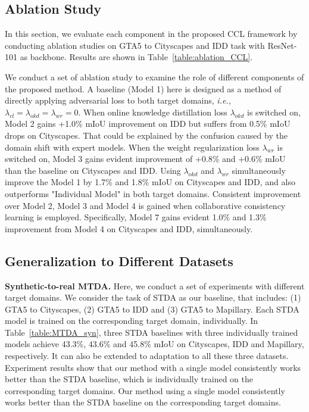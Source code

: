 \subsection{Ablation Study}
In this section, we evaluate each component in the proposed CCL framework by conducting ablation studies on GTA5 to Cityscapes and IDD task with ResNet-101 as backbone. Results are shown in Table~\ref{table:ablation_CCL}.

We conduct a set of ablation study to examine the role of different components of the proposed method. A baseline (Model 1) here is designed as a method of directly applying adversarial loss to both target domains, \textit{i.e.,} $\lambda_{cl}=\lambda_{okd}=\lambda_{wr}=0$. When online knowledge distillation loss $\lambda_{okd}$ is switched on, Model 2 gains +1.0\% mIoU improvement on IDD but suffers from 0.5\% mIoU drops on Cityscapes. That could be explained by the confusion caused by the domain shift with expert models. When the weight regularization loss $\lambda_{wr}$ is switched on, Model 3 gains evident improvement of +0.8\% and +0.6\% mIoU than the baseline on Cityscapes and IDD. Using $\lambda_{okd}$ and $\lambda_{wr}$ simultaneously improve the Model 1 by 1.7\% and 1.8\% mIoU on Cityscapes and IDD, and also outperforms "Individual Model" in both target domains. Consistent improvement over Model 2, Model 3 and Model 4 is gained when collaborative consistency learning is employed. Specifically, Model 7 gains evident 1.0\% and 1.3\% improvement from Model 4 on Cityscapes and IDD, simultaneously.


\subsection{Generalization to Different Datasets}
\textbf{Synthetic-to-real MTDA.}
Here, we conduct a set of experiments with different target domains. We consider the task of STDA as our baseline, that includes: (1) GTA5 to Cityscapes, (2) GTA5 to IDD and (3) GTA5 to Mapillary. Each STDA model is trained on the corresponding target domain, individually. In Table~\ref{table:MTDA_syn}, three STDA baselines with three individually trained models achieve 43.3\%, 43.6\% and 45.8\% mIoU on Cityscapes, IDD and Mapillary, respectively. It can also be extended to adaptation to all these three datasets. Experiment results show that our method with a single model consistently works better than the STDA baseline, which is individually trained on the corresponding target domains. Our method using a single model consistently works better than the STDA baseline on the corresponding target domains. 


